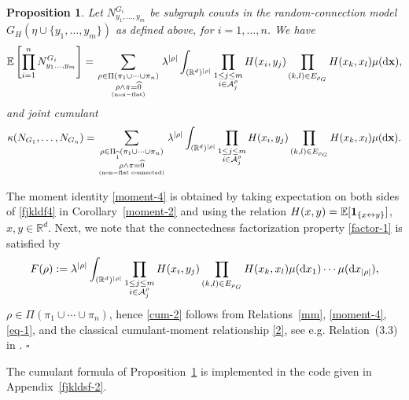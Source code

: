 \documentclass[12pt]{article}
\newcommand{\R}{\mathbb{R}}
\newcommand{\E}{\mathbb{E}}
\newcommand{\bone}{{\bf 1}}
\newtheorem{prop}{Proposition}[section]
\def\real{{\mathord{\mathbb R}}}
\newenvironment{Proof}{\removelastskip\par\medskip
\noindent{\em Proof.} \rm}{\penalty-20\null\hfill$\square$\par\medbreak}
\numberwithin{equation}{section}
\begin{document}
\begin{prop}
  \label{fjklf2}
  Let $  N_{y_1,\ldots , y_m}^{G_i}$ be subgraph counts in the
  random-connection model $G_H (\eta\cup\{y_1,\dots,y_m\})$ as defined above, for $i=1,\dots,n$. We have 
    \begin{equation}\label{moment-4}
      \E\left[\prod_{i=1}^nN^{G_i}_{y_1\dots,y_m}\right]=\sum_{
        \substack{
          \rho\in\Pi(\pi_1 \cup \cdots \cup \pi_n )
      \\\rho\wedge\pi=\widehat{0}} \atop {\rm (non-flat)}}
\lambda^{|\rho|}\int_{(\R^d)^{|\rho|}}\prod_{\substack{ %
      1 \leq j \leq m
      \\ i\in {\cal A}^\rho_j}}
    H(x_i,y_j)\prod_{(k,l)\in E_{\rho_G} }H(x_k,x_l)\mu(\mathrm{d}\mathbf{x}),
\end{equation}
and joint cumulant 
\begin{equation}
  \label{cum-2}
  \kappa(N_{G_1},\dots,N_{G_n})=\sum_{
    \substack{\rho\in\Pi_{\widehat{1}}(\pi_1 \cup \cdots \cup \pi_n )
        \\\rho\wedge\pi=\widehat{0}} \atop {\rm (non-flat \ \! connected)}}
  \lambda^{|\rho|}\int_{(\R^d)^{|\rho|}}
  \prod_{\substack{ %
      1 \leq j \leq m
      \\ i\in {\cal A}^\rho_j}}
    H(x_i,y_j)\prod_{(k,l)\in E_{\rho_G} }H(x_k,x_l)\mu(\mathrm{d}\mathbf{x}). 
\end{equation}
\end{prop}
\begin{Proof}
 The moment identity \eqref{moment-4} is obtained by
 taking expectation on both sides of
 \eqref{fjkldf4} in Corollary~\ref{moment-2}
 and using the relation $H(x,y) = \E [ 
 \bone_{\{x \leftrightarrow y\}}]$,
 $x, y \in \real^d$.
 Next, we note that 
 the connectedness factorization property
 \eqref{factor-1} is satisfied by
 $$F(\rho ):=\lambda^{|\rho |}\int_{(\R^d)^{|\rho |}}
 \prod_{\substack{ %
      1 \leq j \leq m
      \\ i\in {\cal A}^\rho_j}}
 H(x_i,y_j)
 \prod_{(k,l)\in E_{\rho_G} }H(x_k,x_l)\mu(\mathrm{d}x_1)\cdots\mu(\mathrm{d}x_{|\rho |}),
 $$
 $\rho \in\Pi(\pi_1\cup \cdots \cup \pi_n )$,
 hence \eqref{cum-2} follows from
 Relations~\eqref{mm}, \eqref{moment-4},
 \eqref{eq-1}, 
 and the classical cumulant-moment relationship \eqref{2},
 see e.g. Relation~(3.3) in \cite{elukacs}. 
\end{Proof}
\noindent
The cumulant formula of Proposition~\ref{fjklf2}
is implemented in the code given in Appendix~\ref{fjkldsf-2}. 
\end{document}
